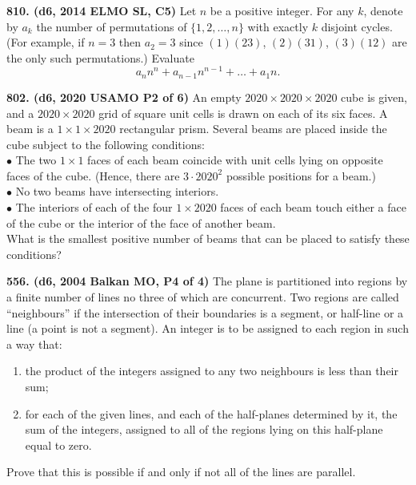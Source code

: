 \documentclass{article}
\begin{document}
        \textbf{810. (\color{red}d6\color{black}, 2014 ELMO SL, C5)} Let $n$ be a positive integer. For any $k$, denote by $a_k$ the number of permutations of $\{1,2,\dots,n\}$ with exactly $k$ disjoint cycles. (For example, if $n=3$ then $a_2=3$ since $(1)(23)$, $(2)(31)$, $(3)(12)$ are the only such permutations.) Evaluate \[ a_n n^n + a_{n-1} n^{n-1} + \dots + a_1 n. \]

        \textbf{802. (\color{red}d6\color{black}, 2020 USAMO P2 of 6)} An empty $2020 \times 2020 \times 2020$ cube is given, and a $2020 \times 2020$ grid of square unit cells is drawn on each of its six faces. A beam is a $1 \times 1 \times 2020$ rectangular prism. Several beams are placed inside the cube subject to the following conditions:\\

$\bullet$ The two $1 \times 1$ faces of each beam coincide with unit cells lying on opposite faces of the cube. (Hence, there are $3 \cdot 2020^2$ possible positions for a beam.)\\

$\bullet$ No two beams have intersecting interiors.\\
$\bullet$ The interiors of each of the four $1 \times 2020$ faces of each beam touch either a face of the cube or the interior of the face of another beam.\\

        What is the smallest positive number of beams that can be placed to satisfy these conditions?

        \textbf{556. (\color{red}d6\color{black}, 2004 Balkan MO, P4 of 4)} The plane is partitioned into regions by a finite number of lines no three of which are concurrent. Two regions are called ``neighbours'' if the intersection of their boundaries is a segment, or half-line or a line (a point is not a segment). An integer is to be assigned to each region in such a way that:
        \begin{enumerate}
                \item the product of the integers assigned to any two neighbours is less than their sum;
                \item for each of the given lines, and each of the half-planes determined by it, the sum of the integers, assigned to all of the regions lying on this half-plane equal to zero.
        \end{enumerate}
        Prove that this is possible if and only if not all of the lines are parallel.
\end{document}
